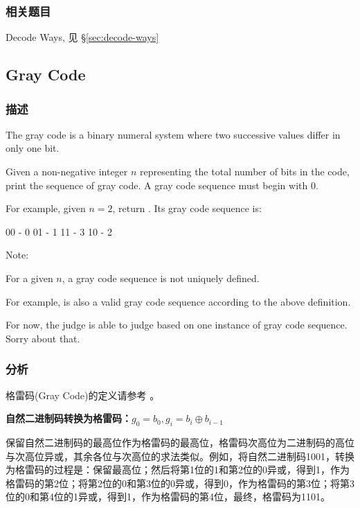 \subsubsection{相关题目}
\begindot
\item Decode Ways, 见 \S \ref{sec:decode-ways}
\myenddot


\subsection{Gray Code} %
\label{sec:gray-code}


\subsubsection{描述}
The gray code is a binary numeral system where two successive values differ in only one bit.

Given a non-negative integer $n$ representing the total number of bits in the code, print the sequence of gray code. A gray code sequence must begin with 0.

For example, given $n = 2$, return \fn{[0,1,3,2]}. Its gray code sequence is:
\begin{Code}
00 - 0
01 - 1
11 - 3
10 - 2
\end{Code}

Note:
\begindot
\item For a given $n$, a gray code sequence is not uniquely defined.
\item For example, \fn{[0,2,3,1]} is also a valid gray code sequence according to the above definition.
\item For now, the judge is able to judge based on one instance of gray code sequence. Sorry about that.
\myenddot


\subsubsection{分析}
格雷码(Gray Code)的定义请参考 。

\textbf{自然二进制码转换为格雷码：$g_0=b_0, g_i=b_i \oplus b_{i-1}$}

保留自然二进制码的最高位作为格雷码的最高位，格雷码次高位为二进制码的高位与次高位异或，其余各位与次高位的求法类似。例如，将自然二进制码1001，转换为格雷码的过程是：保留最高位；然后将第1位的1和第2位的0异或，得到1，作为格雷码的第2位；将第2位的0和第3位的0异或，得到0，作为格雷码的第3位；将第3位的0和第4位的1异或，得到1，作为格雷码的第4位，最终，格雷码为1101。

